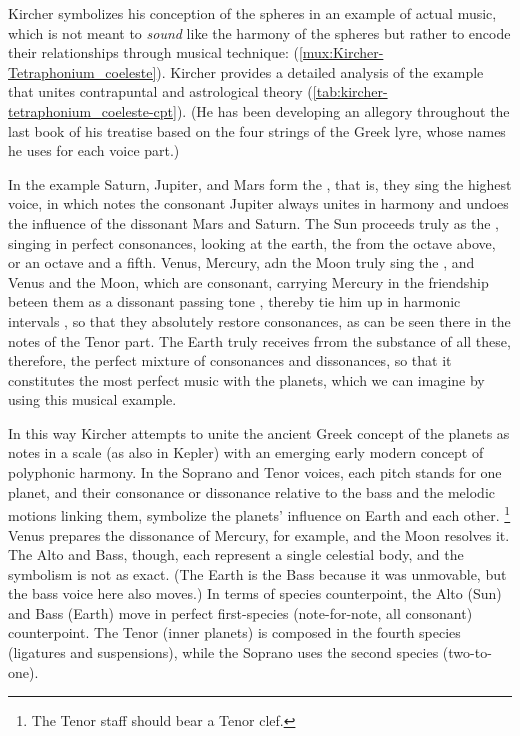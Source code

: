 Kircher symbolizes his conception of the spheres in an example of actual music,
which is not meant to \emph{sound} like the harmony of the spheres but rather to
encode their relationships through musical technique:
 (\cref{mux:Kircher-Tetraphonium_coeleste}).%
    \Autocite[, 383]{Kircher:Musurgia}
Kircher provides a detailed analysis of the example that unites contrapuntal and
astrological theory (\cref{tab:kircher-tetraphonium_coeleste-cpt}).
(He has been developing an allegory throughout the last book of his treatise
based on the four strings of the Greek lyre, whose names he uses for each voice
part.)
\begin{quoting}
	In the example Saturn, Jupiter, and Mars form the , that
	is, they sing the highest voice, in which notes the consonant Jupiter
	always unites in harmony  and undoes the influence of
	 the dissonant Mars and Saturn.
	The Sun proceeds truly as the  , singing in
	perfect consonances, looking at the earth, the 
	 from the octave above, or an octave and a fifth.
	Venus, Mercury, adn the Moon truly sing the 
	, and Venus and the Moon, which are consonant, carrying
	Mercury in the friendship beteen them as a dissonant passing tone
	, thereby tie him up in harmonic
	intervals , so that they absolutely restore
	consonances, as can be seen there in the notes of the Tenor part.
	The Earth truly receives frrom the substance of all these, therefore,
	the perfect mixture of consonances and dissonances, so that it
        constitutes the most perfect music with the planets, which we can
        imagine by using this musical example.%
            \Autocite[, 383--384]{Kircher:Musurgia}
\end{quoting}
In this way Kircher attempts to unite the ancient Greek concept of the planets
as notes in a scale (as also in Kepler) with an emerging early modern concept of
polyphonic harmony.
In the Soprano and Tenor voices, each pitch stands for one planet, and their
consonance or dissonance relative to the bass and the melodic motions linking
them, symbolize the planets' influence on Earth and each other.%
    \footnote{The Tenor staff should bear a Tenor clef.}
Venus prepares the dissonance of Mercury, for example, and the Moon resolves it.
The Alto and Bass, though, each represent a single celestial body, and the
symbolism is not as exact.
(The Earth is the Bass because it was unmovable, but the bass voice here also
moves.)
In terms of species counterpoint, the Alto (Sun) and Bass (Earth) move in
perfect first-species (note-for-note, all consonant) counterpoint.%
The Tenor (inner planets) is composed in the fourth species (ligatures and
suspensions), while the Soprano uses the second species (two-to-one).

